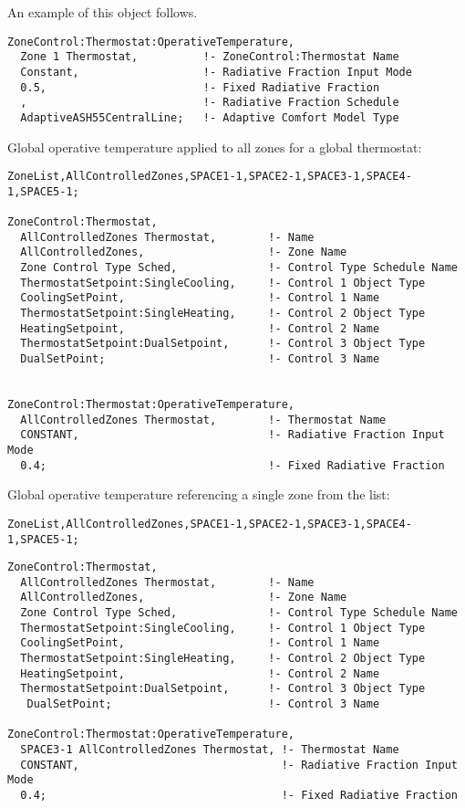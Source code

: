 An example of this object follows.

\begin{lstlisting}
ZoneControl:Thermostat:OperativeTemperature,
  Zone 1 Thermostat,          !- ZoneControl:Thermostat Name
  Constant,                   !- Radiative Fraction Input Mode
  0.5,                        !- Fixed Radiative Fraction
  ,                           !- Radiative Fraction Schedule
  AdaptiveASH55CentralLine;   !- Adaptive Comfort Model Type
\end{lstlisting}

Global operative temperature applied to all zones for a global thermostat:

\begin{lstlisting}
ZoneList,AllControlledZones,SPACE1-1,SPACE2-1,SPACE3-1,SPACE4-1,SPACE5-1;

ZoneControl:Thermostat,
  AllControlledZones Thermostat,        !- Name
  AllControlledZones,                   !- Zone Name
  Zone Control Type Sched,              !- Control Type Schedule Name
  ThermostatSetpoint:SingleCooling,     !- Control 1 Object Type
  CoolingSetPoint,                      !- Control 1 Name
  ThermostatSetpoint:SingleHeating,     !- Control 2 Object Type
  HeatingSetpoint,                      !- Control 2 Name
  ThermostatSetpoint:DualSetpoint,      !- Control 3 Object Type
  DualSetPoint;                         !- Control 3 Name


ZoneControl:Thermostat:OperativeTemperature,
  AllControlledZones Thermostat,        !- Thermostat Name
  CONSTANT,                             !- Radiative Fraction Input Mode
  0.4;                                  !- Fixed Radiative Fraction
\end{lstlisting}

Global operative temperature referencing a single zone from the list:

\begin{lstlisting}
ZoneList,AllControlledZones,SPACE1-1,SPACE2-1,SPACE3-1,SPACE4-1,SPACE5-1;
\end{lstlisting}

\begin{lstlisting}
ZoneControl:Thermostat,
  AllControlledZones Thermostat,        !- Name
  AllControlledZones,                   !- Zone Name
  Zone Control Type Sched,              !- Control Type Schedule Name
  ThermostatSetpoint:SingleCooling,     !- Control 1 Object Type
  CoolingSetPoint,                      !- Control 1 Name
  ThermostatSetpoint:SingleHeating,     !- Control 2 Object Type
  HeatingSetpoint,                      !- Control 2 Name
  ThermostatSetpoint:DualSetpoint,      !- Control 3 Object Type
   DualSetPoint;                        !- Control 3 Name

ZoneControl:Thermostat:OperativeTemperature,
  SPACE3-1 AllControlledZones Thermostat, !- Thermostat Name
  CONSTANT,                               !- Radiative Fraction Input Mode
  0.4;                                    !- Fixed Radiative Fraction
\end{lstlisting}

